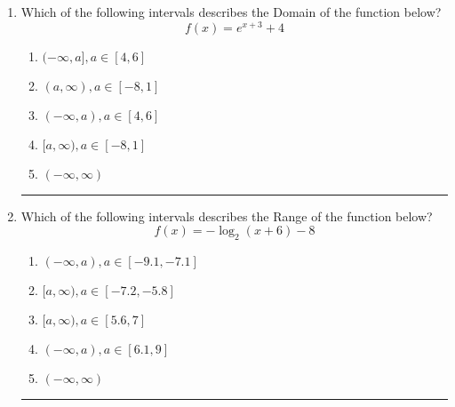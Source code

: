 \documentclass[14pt]{extbook}
\newcommand{\litem}[1]{\item#1\hspace*{-1cm}\rule{\textwidth}{0.4pt}}
\begin{document}
\begin{enumerate}
{\begin{enumerate}[label=\Alph*.]
\end{enumerate} }
\litem{
Which of the following intervals describes the Domain of the function below?\[ f(x) = e^{x+3}+4 \]\begin{enumerate}[label=\Alph*.]
\item \( (-\infty, a], a \in [4, 6] \)
\item \( (a, \infty), a \in [-8, 1] \)
\item \( (-\infty, a), a \in [4, 6] \)
\item \( [a, \infty), a \in [-8, 1] \)
\item \( (-\infty, \infty) \)

\end{enumerate} }
\litem{
Which of the following intervals describes the Range of the function below?\[ f(x) = -\log_2{(x+6)}-8 \]\begin{enumerate}[label=\Alph*.]
\item \( (-\infty, a), a \in [-9.1, -7.1] \)
\item \( [a, \infty), a \in [-7.2, -5.8] \)
\item \( [a, \infty), a \in [5.6, 7] \)
\item \( (-\infty, a), a \in [6.1, 9] \)
\item \( (-\infty, \infty) \)

\end{enumerate} }
\end{enumerate}
\end{document}
